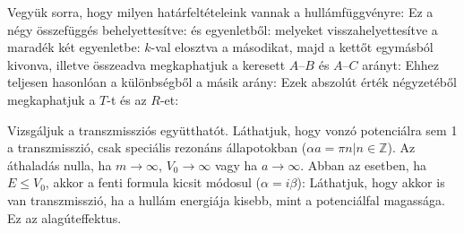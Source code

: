    Vegyük sorra, hogy milyen határfeltételeink vannak a hullámfüggvényre:
   Ez a négy összefüggés behelyettesítve:
    és  egyenletből: 
   melyeket visszahelyettesítve a maradék két egyenletbe:
   $k$-val elosztva a másodikat, majd a kettőt egymásból kivonva, illetve összeadva megkaphatjuk a keresett $A$--$B$ és $A$--$C$ arányt:
   Ehhez teljesen hasonlóan a különbségből a másik arány:
   Ezek abszolút érték négyzetéből megkaphatjuk a $T$-t és az $R$-et:
   
   Vizsgáljuk a transzmissziós együtthatót. Láthatjuk, hogy vonzó potenciálra sem 1 a transzmisszió, csak speciális rezonáns állapotokban ($\alpha a=\pi n|n\in\mathbb{Z}$). Az áthaladás nulla, ha $m\to\infty$, $V_0\to\infty$ vagy ha $a\to\infty$. Abban az esetben, ha $E\le V_0$, akkor a fenti formula kicsit módosul ($\alpha=i\beta$):
   Láthatjuk, hogy akkor is van transzmisszió, ha a hullám energiája kisebb, mint a potenciálfal magassága. Ez az alagúteffektus.